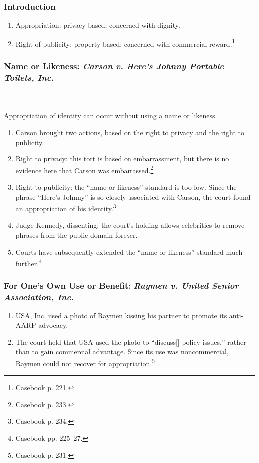 \subsubsection{Introduction}

\begin{enumerate}
    \item Appropriation: privacy-based; concerned with dignity.
    \item Right of publicity: property-based; concerned with commercial 
    reward.\footnote{Casebook p. 221.}
\end{enumerate}

\subsubsection{Name or Likeness: \emph{Carson v. Here's Johnny Portable Toilets, 
Inc.}}
~\\\\
Appropriation of identity can occur without using a name or likeness.

\begin{enumerate}
    \item Carson brought two actions, based on the right to privacy and the 
    right to publicity.
    \item Right to privacy: this tort is based on embarrassment, but there is no 
    evidence here that Carson was embarrassed.\footnote{Casebook p. 233.}
    \item Right to publicity: the ``name or likeness'' standard is too low.  
    Since the phrase ``Here's Johnny'' is so closely associated with Carson, the 
    court found an appropriation of his identity.\footnote{Casebook p. 234.}
    \item Judge Kennedy, dissenting: the court's holding allows celebrities to 
    remove phrases from the public domain forever.
    \item Courts have subsequently extended the ``name or likeness'' standard 
    much further.\footnote{Casebook pp. 225--27.}
\end{enumerate}

\subsubsection{For One's Own Use or Benefit: \emph{Raymen v. United Senior 
Association, Inc.}}

\begin{enumerate}
    \item USA, Inc. used a photo of Raymen kissing his partner to promote its 
    anti-AARP advocacy.
    \item The court held that USA used the photo to ``discuss[] policy issues,'' 
    rather than to gain commercial advantage. Since its use was noncommercial, 
    Raymen could not recover for appropriation.\footnote{Casebook p. 231.}
\end{enumerate}

